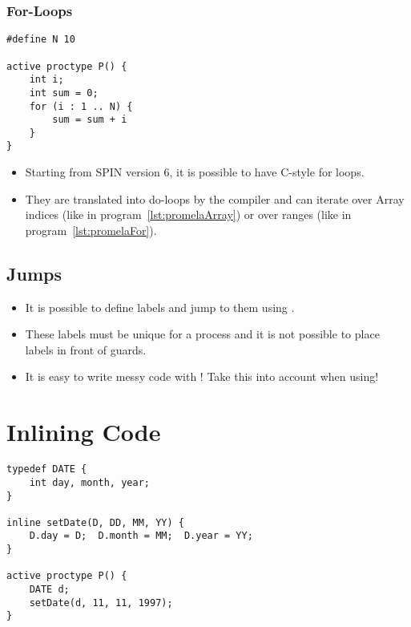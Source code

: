 			\subsubsection{For-Loops}
				\begin{lstlisting}[caption = { PROMELA For-Loops }, label = lst:promelaFor, language = PROMELA]
#define N 10

active proctype P() {
	int i;
	int sum = 0;
	for (i : 1 .. N) {
		sum = sum + i
	}
}
				\end{lstlisting}
			
				\begin{itemize}
					\item Starting from SPIN version 6, it is possible to have C-style for loops.
					\item They are translated into do-loops by the compiler and can iterate over Array indices (like in program~\ref{lst:promelaArray}) or over ranges (like in program~\ref{lst:promelaFor}).
				\end{itemize}

		\subsection{Jumps}
			
		
			\begin{itemize}
				\item It is possible to define labels and jump to them using .
				\item These labels must be unique for a process and it is not possible to place labels in front of guards.
				\item It is easy to write messy code with ! Take this into account when using!
			\end{itemize}

	\section{Inlining Code}
		\begin{lstlisting}[caption = { PROMELA Inlines }, label = lst:promelaInline, language = PROMELA]
typedef DATE {
	int day, month, year;
}

inline setDate(D, DD, MM, YY) {
	D.day = D;  D.month = MM;  D.year = YY;
}

active proctype P() {
	DATE d;
	setDate(d, 11, 11, 1997);
}
		\end{lstlisting}

